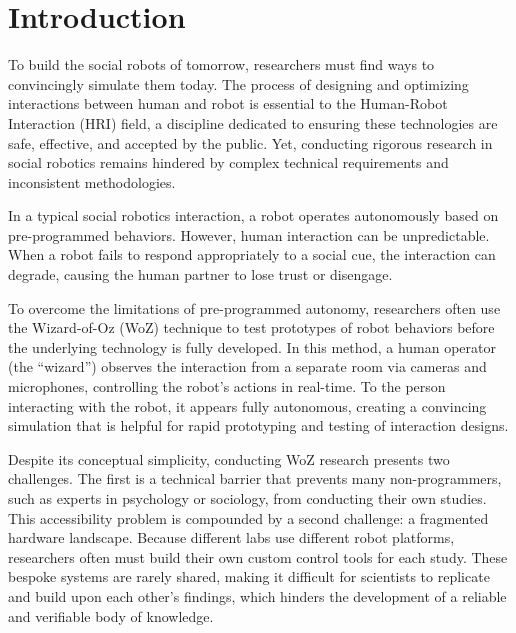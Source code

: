 \documentclass[numbib]{buthesis_p}  %
\begin{document}
\author{Sean O'Connor}
\maketitle

\doublespacing

\section{Introduction}

To build the social robots of tomorrow, researchers must find ways to convincingly simulate them today. The process of designing and optimizing interactions between human and robot is essential to the Human-Robot Interaction (HRI) field, a discipline dedicated to ensuring these technologies are safe, effective, and accepted by the public. Yet, conducting rigorous research in social robotics remains hindered by complex technical requirements and inconsistent methodologies.

In a typical social robotics interaction, a robot operates autonomously based on pre-programmed behaviors. However, human interaction can be unpredictable. When a robot fails to respond appropriately to a social cue, the interaction can degrade, causing the human partner to lose trust or disengage.

To overcome the limitations of pre-programmed autonomy, researchers often use the Wizard-of-Oz (WoZ) technique to test prototypes of robot behaviors before the underlying technology is fully developed. In this method, a human operator (the ``wizard'') observes the interaction from a separate room via cameras and microphones, controlling the robot's actions in real-time. To the person interacting with the robot, it appears fully autonomous, creating a convincing simulation that is helpful for rapid prototyping and testing of interaction designs.

Despite its conceptual simplicity, conducting WoZ research presents two challenges. The first is a technical barrier that prevents many non-programmers, such as experts in psychology or sociology, from conducting their own studies. This accessibility problem is compounded by a second challenge: a fragmented hardware landscape. Because different labs use different robot platforms, researchers often must build their own custom control tools for each study. These bespoke systems are rarely shared, making it difficult for scientists to replicate and build upon each other's findings, which hinders the development of a reliable and verifiable body of knowledge.
\end{document}
